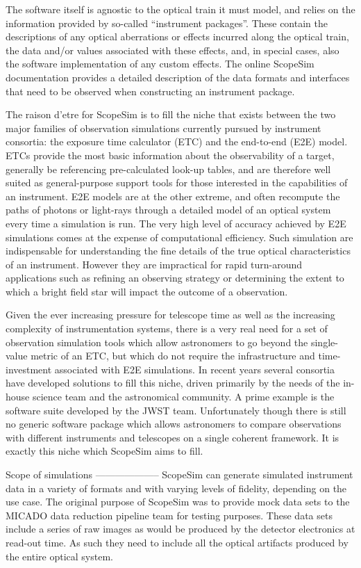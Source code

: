 The software itself is agnostic to the optical train it must model, and
relies on the information provided by so-called ``instrument packages''.
These contain the descriptions of any optical aberrations or effects incurred
along the optical train, the data and/or values associated with these
effects, and, in special cases, also the software implementation of any
custom effects. The online ScopeSim documentation provides a detailed
description of the data formats and interfaces that need to be observed when
constructing an instrument package.

The raison d'etre for ScopeSim is to fill the niche that exists between the
two major families of observation simulations currently pursued by instrument
consortia: the exposure time calculator (ETC) and the end-to-end (E2E) model.
ETCs provide the most basic information about the observability of a target,
generally be referencing pre-calculated look-up tables, and are therefore
well suited as general-purpose support tools for those interested in the
capabilities of an instrument. E2E models are at the other extreme, and
often recompute the paths of photons or light-rays through a detailed model
of an optical system every time a simulation is run. The very high level of
accuracy achieved by E2E simulations comes at the expense of computational
efficiency. Such simulation are indispensable for understanding the fine
details of the true optical characteristics of an instrument. However they are
impractical for rapid turn-around applications such as refining an
observing strategy or determining the extent to which a bright field star
will impact the outcome of a observation.

Given the ever increasing pressure for telescope time as well as the
increasing complexity of instrumentation systems, there is a very real need
for a set of observation simulation tools which allow astronomers to go
beyond the single-value metric of an ETC, but which do not require the
infrastructure and time-investment associated with E2E simulations. In recent
years several consortia have developed solutions to fill this niche, driven
primarily by the needs of the in-house science team and the astronomical
community. A prime example is the software suite developed by the JWST team.
Unfortunately though there is still no generic software
package which allows astronomers to compare observations with different
instruments and telescopes on a single coherent framework. It is exactly this
niche which ScopeSim aims to fill.


Scope of simulations
--------------------
ScopeSim can generate simulated instrument data in a variety of formats and
with varying levels of fidelity, depending on the use case. The original purpose
of ScopeSim was to provide mock data sets to the MICADO data reduction pipeline
team for testing purposes. These data sets include a series of raw images as
would be produced by the detector electronics at read-out time. As such they
need to include all the optical artifacts produced by the entire optical system.

